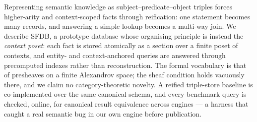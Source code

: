 Representing semantic knowledge as subject--predicate--object triples forces
higher-arity and context-scoped facts through reification: one statement
becomes many records, and answering a simple lookup becomes a multi-way
join. We describe SFDB, a prototype database whose organising principle is
instead the \emph{context poset}: each fact is stored atomically as a
section over a finite poset of contexts, and entity- and context-anchored
queries are
answered through precomputed indexes rather than reconstruction. The formal
vocabulary is that
of presheaves on a finite Alexandrov space; the sheaf condition holds
vacuously there, and we claim no category-theoretic novelty. A reified
triple-store baseline is co-implemented over the same canonical schema, and
every benchmark query is checked, online, for canonical result equivalence
across engines --- a harness that caught a real semantic bug in our own
engine before publication.

